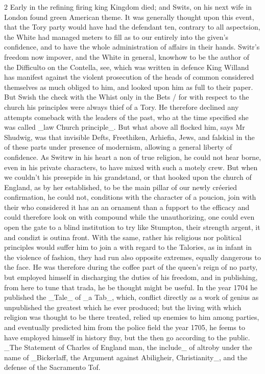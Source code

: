 \documentclass[10pt]{article}
\begin{document}
\begin{multicols}{2}
Early in the refining firing king Kingdom died; and Swits, on his next wife in London found green American theme. It was generally thought upon this event, that the Tory party would have had the defendant ten, contrary to all aspectsion, the White had managed meters to fill as to our entirely into the given’s confidence, and to have the whole administration of affairs in their hands. Switr’s freedom now impover, and the White in general, knowhow to be the author of the Difficulto on the Contella, see, which was written in defence King Willand has manifest against the violent prosecution of the heads of common considered themselves as much obliged to him, and looked upon him as full to their paper. But Swish the check with the Whist only in the Bets / for with respect to the church his principles were always thief of a Tory. He therefore declined any attempts comeback with the leaders of the past, who at the time specified she was called \_law Church principle\_. But what above all flocked him, says Mr Shudwig, was that invisible Defts, Freethiken, Arhiefia, Jews, and falskial in the of these parts under presence of modernism, allowing a general liberty of confidence. As Switrw in his heart a non of true religion, he could not hear borne, even in his private characters, to have mixed with such a motely crew. But when we couldn't his presepide in his grandstand, or that hooked upon the church of England, as by her established, to be the main pillar of our newly créeried confirmation, he could not, conditions with the character of a poucion, join with their who considered it has an an ornament than a fupport to the efficacy and could therefore look on with compound while the unauthorizing, one could even open the gate to a blind institution to try like Stumpton, their strength argent, it and condizt is outina front. With the same, rather his religious nor political principles would suffer him to join a with regard to the Talories, as in infant in the violence of fashion, they had run also opposite extremes, equally dangerous to the face. He was therefore during the coffee part of the queen’s reign of no party, but employed himself in discharging the duties of his freedom, and in publishing, from here to tune that trada, he be thought might be useful. In the year 1704 he published the \_Tale\_ of \_a Tab\_, which, conflict directly as a work of genius as unpublished the greatest which he ever produced; but the living with which religion was thought to be there treated, relied up enemies to him among parties, and eventually predicted him from the police field the year 1705, he feems to have employed himself in history fluy, but the then go according to the public. \_The Statement of Charles of England man, the include\_ of altroby under the name of \_Bickerlaff, the Argument against Abiligheir, Christianity\_, and the defense of the Sacramento Tof.


\end{multicols}
\end{document}
